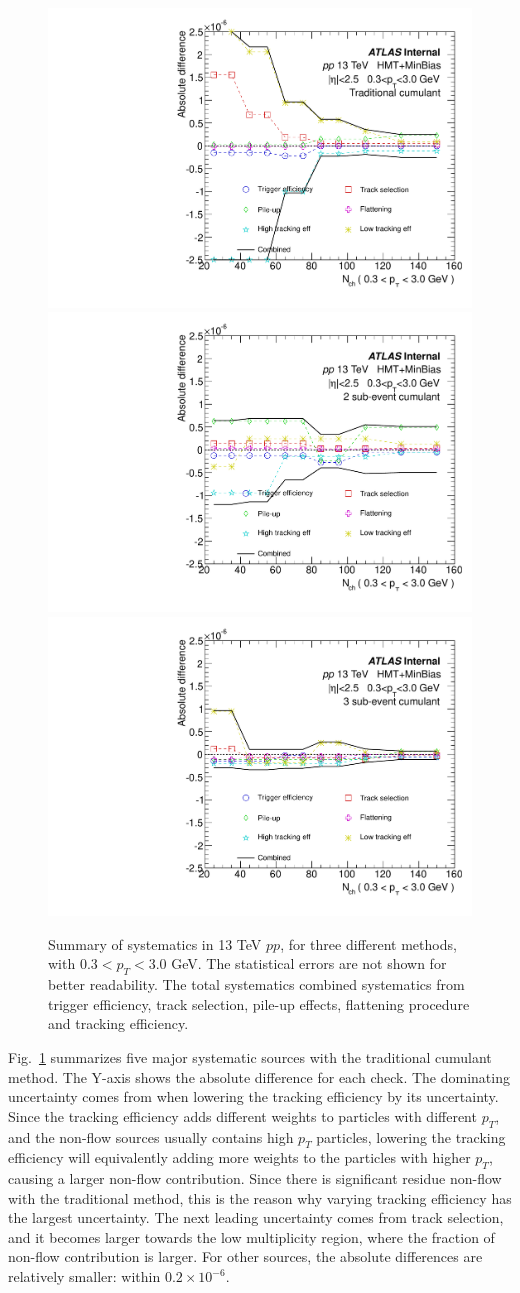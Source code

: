 \begin{figure}[H]
\centering
\includegraphics[width=0.3\linewidth]{figs/sec_sys/pp13/sys_pp13_NNNN_Har0_Pt0_Cls0.pdf}
\includegraphics[width=0.3\linewidth]{figs/sec_sys/pp13/sys_pp13_ABAB_Har0_Pt0_Cls0.pdf}
\includegraphics[width=0.3\linewidth]{figs/sec_sys/pp13/sys_pp13_ABAC_Har0_Pt0_Cls0.pdf}
\caption{Summary of systematics in 13 TeV $pp$, for three different methods, with $0.3<p_{T}<3.0$ GeV. The statistical errors are not shown for better readability. The total systematics combined systematics from trigger efficiency, track selection, pile-up effects, flattening procedure and tracking efficiency.}
\label{fig:sys_pp13_sum_pt0}
\end{figure}
Fig.~\ref{fig:sys_pp13_sum_pt0} summarizes five major systematic sources with the traditional cumulant method. The Y-axis shows the absolute difference for each check. The dominating uncertainty comes from when lowering the tracking efficiency by its uncertainty. Since the tracking efficiency adds different weights to particles with different $p_{T}$, and the non-flow sources usually contains high $p_{T}$ particles, lowering the tracking efficiency will equivalently adding more weights to the particles with higher $p_{T}$, causing a larger non-flow contribution. Since there is significant residue non-flow with the traditional method, this is the reason why varying tracking efficiency has the largest uncertainty. The next leading uncertainty comes from track selection, and it becomes larger towards the low multiplicity region, where the fraction of non-flow contribution is larger. For other sources, the absolute differences are relatively smaller: within $0.2\times 10^{-6}$.

